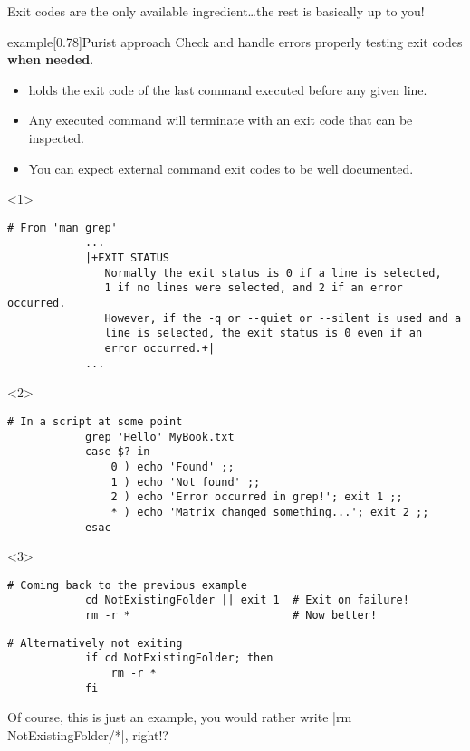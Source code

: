 \begin{frame}[fragile]{Exit codes are the only available ingredient}{\ldots{}the rest is basically up to you!}
    \vspace{-3mm}
    {
        \large
        \begin{varblock}{example}[0.78\textwidth]{Purist approach}
            Check and handle errors properly testing exit codes \textbf{when needed}.
        \end{varblock}
    }
    \begin{itemize}
        \item {} holds the exit code of the last command executed before any given line.
        \item Any executed command will terminate with an exit code that can be inspected.
        \item You can expect external command exit codes to be well documented.
    \end{itemize}
    \begin{onlyenv}<1>
        \begin{lstlisting}[style=myBash, numbers=none, aboveskip=4mm]
            # From 'man grep'
            ...
            |+EXIT STATUS
               Normally the exit status is 0 if a line is selected,
               1 if no lines were selected, and 2 if an error occurred.
               However, if the -q or --quiet or --silent is used and a
               line is selected, the exit status is 0 even if an
               error occurred.+|
            ...
        \end{lstlisting}
    \end{onlyenv}
    \begin{onlyenv}<2>
        \begin{lstlisting}[style=myBash, numbers=none, aboveskip=4mm]
            # In a script at some point
            grep 'Hello' MyBook.txt
            case $? in
                0 ) echo 'Found' ;;
                1 ) echo 'Not found' ;;
                2 ) echo 'Error occurred in grep!'; exit 1 ;;
                * ) echo 'Matrix changed something...'; exit 2 ;;
            esac
        \end{lstlisting}
    \end{onlyenv}
    \begin{onlyenv}<3>
        \begin{lstlisting}[style=myBash, numbers=none, aboveskip=4mm]
            # Coming back to the previous example
            cd NotExistingFolder || exit 1  # Exit on failure!
            rm -r *                         # Now better!
        \end{lstlisting}
        \begin{lstlisting}[style=myBash, numbers=none, aboveskip=2mm, belowskip=-6mm]
            # Alternatively not exiting
            if cd NotExistingFolder; then
                rm -r *
            fi
        \end{lstlisting}
        \centerline{\scriptsize Of course, this is just an example, you would rather write \;\bash|rm NotExistingFolder/*|\;, right!?}
    \end{onlyenv}
\end{frame}
